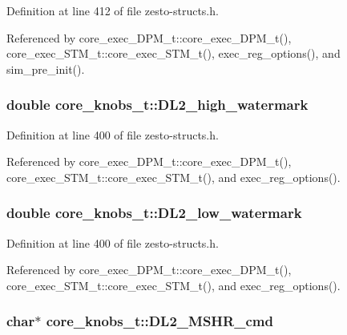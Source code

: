 Definition at line 412 of file zesto-structs.h.

Referenced by core\_\-exec\_\-DPM\_\-t::core\_\-exec\_\-DPM\_\-t(), core\_\-exec\_\-STM\_\-t::core\_\-exec\_\-STM\_\-t(), exec\_\-reg\_\-options(), and sim\_\-pre\_\-init().
\subsubsection[{DL2\_\-high\_\-watermark}]{\setlength{\rightskip}{0pt plus 5cm}double {\bf core\_\-knobs\_\-t::DL2\_\-high\_\-watermark}}\label{structcore__knobs__t_f4104b47b939c9ba3524fc427e116520}




Definition at line 400 of file zesto-structs.h.

Referenced by core\_\-exec\_\-DPM\_\-t::core\_\-exec\_\-DPM\_\-t(), core\_\-exec\_\-STM\_\-t::core\_\-exec\_\-STM\_\-t(), and exec\_\-reg\_\-options().
\subsubsection[{DL2\_\-low\_\-watermark}]{\setlength{\rightskip}{0pt plus 5cm}double {\bf core\_\-knobs\_\-t::DL2\_\-low\_\-watermark}}\label{structcore__knobs__t_ea62434debe2c605e5df42b24d8a2690}




Definition at line 400 of file zesto-structs.h.

Referenced by core\_\-exec\_\-DPM\_\-t::core\_\-exec\_\-DPM\_\-t(), core\_\-exec\_\-STM\_\-t::core\_\-exec\_\-STM\_\-t(), and exec\_\-reg\_\-options().
\subsubsection[{DL2\_\-MSHR\_\-cmd}]{\setlength{\rightskip}{0pt plus 5cm}char$\ast$ {\bf core\_\-knobs\_\-t::DL2\_\-MSHR\_\-cmd}}\label{structcore__knobs__t_af0904c8498e9f7a6e5bbcf4f2de8d44}




